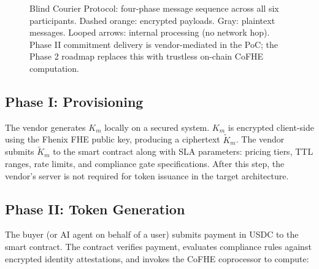 \documentclass[conference]{IEEEtran}
\begin{document}
\begin{figure}[!t]
\caption{Blind Courier Protocol: four-phase message sequence across all six participants.
Dashed orange: encrypted payloads. Gray: plaintext messages. Looped arrows: internal
processing (no network hop). Phase II commitment delivery is vendor-mediated in the PoC;
the Phase 2 roadmap replaces this with trustless on-chain CoFHE computation.}
\label{fig:protocol}
\end{figure}

\subsection{Phase I: Provisioning}
The vendor generates $K_m$ locally on a secured system. $K_m$ is encrypted client-side
using the Fhenix FHE public key, producing a ciphertext $\tilde{K}_m$. The vendor
submits $\tilde{K}_m$ to the smart contract along with SLA parameters: pricing tiers,
TTL ranges, rate limits, and compliance gate specifications. After this step, the vendor's
server is not required for token issuance in the target architecture.

\subsection{Phase II: Token Generation}
The buyer (or AI agent on behalf of a user) submits payment in USDC to the smart contract.
The contract verifies payment, evaluates compliance rules against encrypted identity
attestations, and invokes the CoFHE coprocessor to compute:
\end{document}

